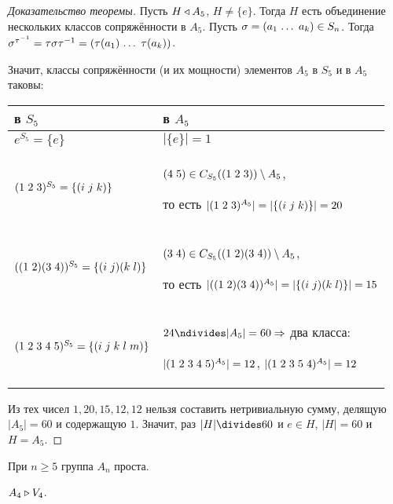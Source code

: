 \documentclass[main]{subfiles}
\begin{document}
\begin{proof}[Доказательство теоремы]
  Пусть $H \triangleleft A_5$, $H \ne \{ e \}$.
  Тогда $H$ есть объединение нескольких
  классов сопряжённости в $A_5$.
  Пусть $\sigma = \Cycle{a_1 & \dots & a_k} \in S_n$.
  Тогда $\sigma^{\tau^{-1}} = \tau \sigma \tau^{-1} =
  \Cycle{\tau(a_1) & \dots & \tau(a_k)}$.
  
  Значит, классы сопряжённости 
  (и их мощности)
  элементов $A_5$ в $S_5$
  и в \( A_5 \) таковы:

  \begin{center}
    \begin{tabularx}{0.82\textwidth}{|l|X|}
      \hline
      в $S_5$ & в $A_5$ \\
      \hline
      \hline
      $e^{S_5} = \{ e \}$  & \(|\{ e \}| = 1\) \\
      \hline
      $\Cycle{1&2&3}^{S_5} = \{ \Cycle{i&j&k} \}
       $ & $\Cycle{4&5} \in C_{S_5}(\Cycle{1&2&3}) \setminus A_5$,

      то есть
      $|\Cycle{1&2&3}^{A_5}| = |\{ \Cycle{i&j&k} \}| = 20$ \\
      \hline
      $(\Cycle{1&2}\Cycle{3&4})^{S_5} =
      \{ \Cycle{i&j}\Cycle{k&l} \}$ &
      $\Cycle{3&4} \in C_{S_5}
      (\Cycle{1&2}\Cycle{3&4}) \setminus
      A_5$,

      то есть
      $|(\Cycle{1&2}\Cycle{3&4})^{A_5}| =
      |\{ \Cycle{i&j}\Cycle{k&l} \}| = 15$ \\
      \hline
      $\Cycle{1&2&3&4&5}^{S_5} = \{ \Cycle{i&j&k&l&m}
      \}$  &
      \( 24 \ndivides |A_5| = 60 \To \) 
      два класса:

      $|\Cycle{1&2&3&4&5}^{A_5}| = 12$, $|\Cycle{1&2&3&5&4}^{A_5}| = 12$ \\
      \hline
    \end{tabularx}
  \end{center}

  Из тех чисел $1, 20, 15, 12, 12$ нельзя составить нетривиальную сумму,
  делящую $|A_5| = 60$ и содержащую $1$.
  Значит, раз $|H| \divides 60$
  и $e \in H$,
  $|H| = 60$ и $H = A_5$.
\end{proof}

\begin{theorem}
  При $n \ge 5$ группа $A_n$ проста.
\end{theorem}
\begin{remark}
  $A_4 \triangleright V_4$.
\end{remark}
\end{document}
